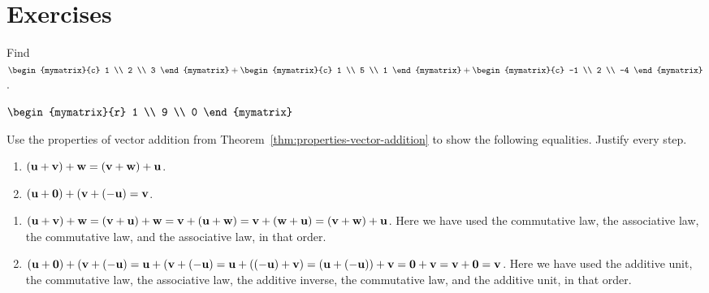 \section*{Exercises}

\begin{enumialphparenastyle}

\begin{ex}
  Find $\begin{mymatrix}{c}
    1 \\
    2 \\
    3
  \end{mymatrix} +\begin{mymatrix}{c}
    1 \\
    5 \\
    1
  \end{mymatrix} +\begin{mymatrix}{c}
    -1 \\
    2 \\
    -4
  \end{mymatrix}$.
  
  \begin{sol}
    $\begin{mymatrix}{r}
      1 \\
      9 \\
      0
    \end{mymatrix}$
  \end{sol}
\end{ex}

\begin{ex}
  Use the properties of vector addition from
  Theorem~\ref{thm:properties-vector-addition} to show the following
  equalities. Justify every step. 
  \begin{enumerate}
  \item $(\mbox{\bf u}+\mbox{\bf v})+\mbox{\bf w} = (\mbox{\bf v}+\mbox{\bf w})+\mbox{\bf u}$.
  \item $(\mbox{\bf u}+\mbox{\bf 0})+(\mbox{\bf v}+(-\mbox{\bf u}) = \mbox{\bf v}$.
  \end{enumerate}

  \begin{sol}
    \begin{enumerate}
    \item
      $(\mbox{\bf u}+\mbox{\bf v})+\mbox{\bf w} = (\mbox{\bf v}+\mbox{\bf u})+\mbox{\bf w} =
      \mbox{\bf v}+(\mbox{\bf u}+\mbox{\bf w}) = \mbox{\bf v}+(\mbox{\bf w}+\mbox{\bf u}) =
      (\mbox{\bf v}+\mbox{\bf w})+\mbox{\bf u}$. Here we have used the commutative
      law, the associative law, the commutative law, and the
      associative law, in that order.
    \item
      $(\mbox{\bf u}+\mbox{\bf 0})+(\mbox{\bf v}+(-\mbox{\bf u}) =
      \mbox{\bf u}+(\mbox{\bf v}+(-\mbox{\bf u}) = \mbox{\bf u}+((-\mbox{\bf u})+\mbox{\bf v})
      = (\mbox{\bf u}+(-\mbox{\bf u}))+\mbox{\bf v} = \mbox{\bf 0}+\mbox{\bf v} =
      \mbox{\bf v}+\mbox{\bf 0} = \mbox{\bf v}$. Here we have used the additive
      unit, the commutative law, the associative law, the additive
      inverse, the commutative law, and the additive unit, in that
      order.
    \end{enumerate}
  \end{sol}
\end{ex}

\end{enumialphparenastyle}
